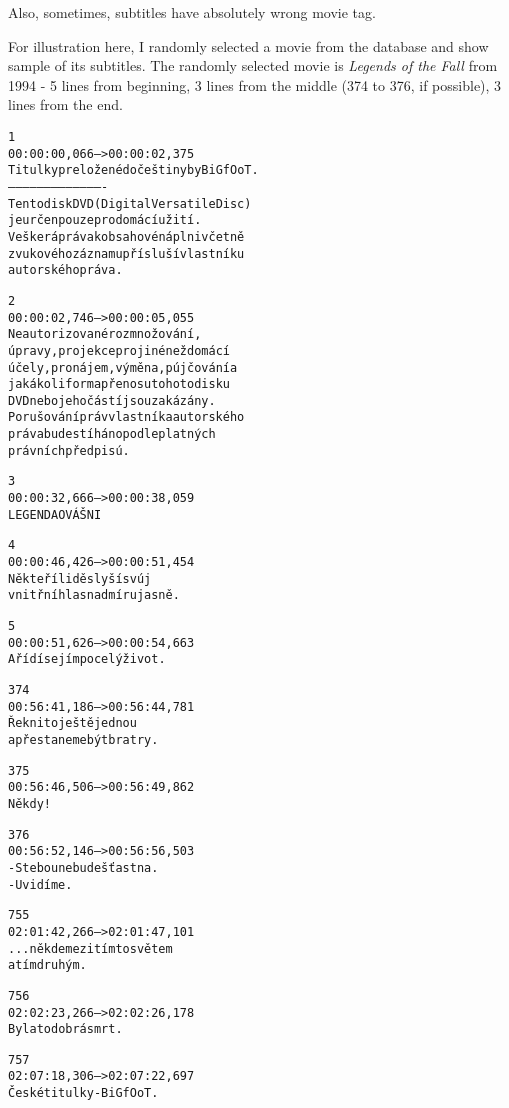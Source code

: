 Also, sometimes, subtitles have absolutely wrong movie tag.

For illustration here, I randomly selected a movie from the database and show sample of its subtitles. The randomly selected movie is \emph{Legends of the Fall} from 1994 - 5 lines from beginning, 3 lines from the middle (374 to 376, if possible), 3 lines from the end.
 

\newenvironment{subexam}{\begin{boxedminipage}[b]{0.4\textwidth}
\footnotesize
\begin{alltt}
}
{
\end{alltt}
\end{boxedminipage}}



\begin{subexam}
1
00:00:00,066 --> 00:00:02,375
Titulky preložené do češtiny by BiGfOoT.
----------------------------------------
Tento disk DVD (Digital Versatile Disc)
je určen pouze pro domácí užití.
Veškerá práva k obsahové náplni včetně
zvukového záznamu přísluší vlastníku
autorského práva.

2
00:00:02,746 --> 00:00:05,055
Neautorizované rozmnožování,
úpravy, projekce pro jiné než domácí
účely, pronájem, výměna, pújčování a
jakákoli forma přenosu tohoto disku
DVD nebo jeho částí jsou zakázány.
Porušování práv vlastníka autorského
práva bude stíháno podle platných
právních předpisú.

3
00:00:32,666 --> 00:00:38,059
LEGENDA O VÁŠNI

4
00:00:46,426 --> 00:00:51,454
Někteří lidě slyší svúj
vnitřní hlas nadmíru jasně.

5
00:00:51,626 --> 00:00:54,663
A řídí se jím po celý život.

374
00:56:41,186 --> 00:56:44,781
Řekni to ještě jednou
a přestaneme být bratry.

375
00:56:46,506 --> 00:56:49,862
Někdy!

376
00:56:52,146 --> 00:56:56,503
- S tebou nebude šťastna.
- Uvidíme.

755
02:01:42,266 --> 02:01:47,101
... někde mezi tímto světem
a tím druhým.

756
02:02:23,266 --> 02:02:26,178
Byla to dobrá smrt.

757
02:07:18,306 --> 02:07:22,697
České titulky - BiGfOoT.
\end{subexam}
\hspace{0.5cm}
